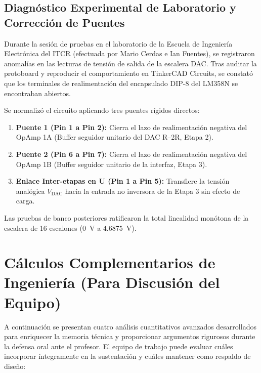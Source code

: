 \documentclass[11pt,letterpaper]{article}
\begin{document}
\subsection{Diagnóstico Experimental de Laboratorio y Corrección de Puentes}
Durante la sesión de pruebas en el laboratorio de la Escuela de Ingeniería Electrónica del ITCR (efectuada por Mario Cerdas e Ian Fuentes), se registraron anomalías en las lecturas de tensión de salida de la escalera DAC. Tras auditar la protoboard y reproducir el comportamiento en TinkerCAD Circuits, se constató que los terminales de realimentación del encapsulado DIP-8 del LM358N se encontraban abiertos.

Se normalizó el circuito aplicando tres puentes rígidos directos:
\begin{enumerate}
    \item \textbf{Puente 1 (Pin 1 a Pin 2):} Cierra el lazo de realimentación negativa del OpAmp 1A (Buffer seguidor unitario del DAC R--2R, Etapa 2).
    \item \textbf{Puente 2 (Pin 6 a Pin 7):} Cierra el lazo de realimentación negativa del OpAmp 1B (Buffer seguidor unitario de la interfaz, Etapa 3).
    \item \textbf{Enlace Inter-etapas en U (Pin 1 a Pin 5):} Transfiere la tensión analógica $V_{\text{DAC}}$ hacia la entrada no inversora de la Etapa 3 sin efecto de carga.
\end{enumerate}
Las pruebas de banco posteriores ratificaron la total linealidad monótona de la escalera de 16 escalones (\SI{0}{\volt} a \SI{4.6875}{\volt}).

\section{Cálculos Complementarios de Ingeniería (Para Discusión del Equipo)}

A continuación se presentan cuatro análisis cuantitativos avanzados desarrollados para enriquecer la memoria técnica y proporcionar argumentos rigurosos durante la defensa oral ante el profesor. El equipo de trabajo puede evaluar cuáles incorporar íntegramente en la sustentación y cuáles mantener como respaldo de diseño:
\end{document}
